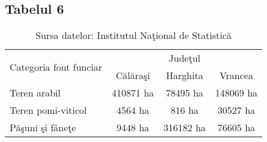 \documentclass{article}
\begin{document}
\subsection*{Tabelul 6}

\begin{table}[htbp]
	\centering
	\begin{tabular}{|l| c| c| c|}
		\hline
		\multirow{2}{*}{Categoria font funciar} & \multicolumn{3}{c|}{Judeţul} \\
		\cline{2-4}
		& Călăraşi & Harghita & Vrancea \\
		\hline
		Teren arabil & 410871 ha & 78495 ha & 148069 ha \\
		\hline
		Teren pomi-viticol & 4564 ha & 816 ha & 30527 ha \\
		\hline
		Păşuni şi fâneţe & 9448 ha & 316182 ha & 76605 ha \\
		\hline
	\end{tabular}
	\caption{Sursa datelor: Institutul Naţional de Statistică}
\end{table}
\end{document}
